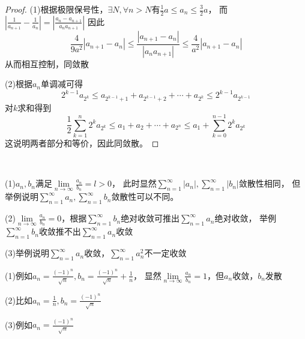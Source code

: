 \begin{proof}
  (1)根据极限保号性，$\exists N, \forall n > N$有$\frac{1}{2}a \leq a_n \leq \frac{3}{2}a$，
  而$\left| \frac{1}{a_{n+1}} - \frac{1}{a_n} \right| = \left| \frac{a_n - a_{n+1}}{a_na_{n+1}} \right|$
  因此
  \begin{equation*}
    \frac{4}{9a^2} |a_{n+1} - a_n| \leq \frac{|a_{n+1} - a_n|}{|a_na_{n+1}|} \leq \frac{4}{a^2}|a_{n+1} - a_n|
  \end{equation*}
  从而相互控制，同敛散

  (2)根据$a_n$单调减可得
  \begin{equation*}
    2^{k-1}a_{2^k} \leq a_{2^{k-1}+1} + a_{2^{k-1}+2} + \cdots + a_{2^k} \leq 2^{k-1}a_{2^{k-1}}
  \end{equation*}
  对$k$求和得到
  \begin{equation*}
    \frac{1}{2} \sum\limits_{k = 1}^n 2^k a_{2^k} \leq a_1 + a_2 + \cdots + a_{2^n} \leq a_1 + \sum\limits_{k = 0}^{n-1}2^k a_{2^k}
  \end{equation*}
  这说明两者部分和等价，因此同敛散。
\end{proof}

~

\begin{exercise}[比较原则对于一般项级数不成立的反例]
  (1)$a_n,b_n$满足$\lim \limits _{n \rightarrow \infty} \frac{a_n}{b_n} = l > 0$，
  此时显然$\sum\limits_{n = 1}^{\infty}|a_n|, \sum\limits_{n = 1}^{\infty}|b_n|$敛散性相同，
  但举例说明$\sum\limits_{n = 1}^{\infty}a_n, \sum\limits_{n = 1}^{\infty}b_n$敛散性可以不同。

  (2)$\lim \limits _{n \rightarrow \infty} \frac{a_n}{b_n} = 0$，根据$\sum\limits_{n = 1}^{\infty}b_n$绝对收敛可推出$\sum\limits_{n = 1}^{\infty}a_n$绝对收敛，
  举例$\sum\limits_{n = 1}^{\infty}b_n$收敛推不出$\sum\limits_{n = 1}^{\infty}a_n$收敛

  (3)举例说明$\sum\limits_{n = 1}^{\infty}a_n$收敛，$\sum\limits_{n = 1}^{\infty}a_n^2$不一定收敛
\end{exercise}

\begin{solution}
  (1)例如$a_n = \frac{(-1)^n}{\sqrt{n}}, b_n = \frac{(-1)^n}{\sqrt{n} } + \frac{1}{n}$，
  显然$\lim \limits _{n \rightarrow \infty} \frac{a_n}{b_n} = 1$，但$a_n$收敛，$b_n$发散

  (2)比如$a_n = \frac{1}{n}, b_n = \frac{(-1)^n}{\sqrt{n}}$

  (3)例如$a_n = \frac{(-1)^n}{\sqrt{n}}$
\end{solution}